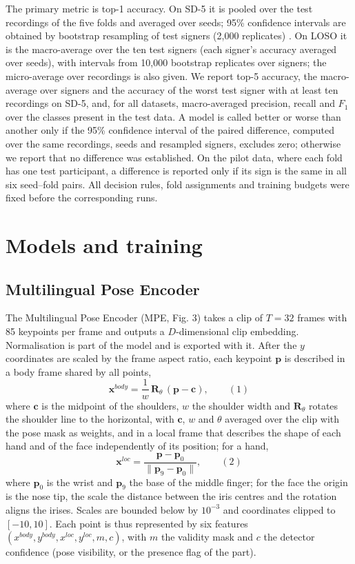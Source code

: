 \documentclass[a4paper,fleqn]{cas-dc}
\begin{document}
The primary metric is top-1 accuracy. On SD-5 it is pooled over the test recordings of the five folds and averaged over seeds; 95\% confidence intervals are obtained by bootstrap resampling of test signers (2,000 replicates) \cite{2016_efron_hastie_casi}. On LOSO it is the macro-average over the ten test signers (each signer's accuracy averaged over seeds), with intervals from 10,000 bootstrap replicates over signers; the micro-average over recordings is also given. We report top-5 accuracy, the macro-average over signers and the accuracy of the worst test signer with at least ten recordings on SD-5, and, for all datasets, macro-averaged precision, recall and \(F_1\) over the classes present in the test data. A model is called better or worse than another only if the 95\% confidence interval of the paired difference, computed over the same recordings, seeds and resampled signers, excludes zero; otherwise we report that no difference was established. On the pilot data, where each fold has one test participant, a difference is reported only if its sign is the same in all six seed--fold pairs. All decision rules, fold assignments and training budgets were fixed before the corresponding runs.

\hypertarget{models-and-training}{%
\section{Models and training}\label{models-and-training}}

\hypertarget{multilingual-pose-encoder}{%
\subsection{Multilingual Pose Encoder}\label{multilingual-pose-encoder}}

The Multilingual Pose Encoder (MPE, Fig. 3) takes a clip of \(T = 32\) frames with 85 keypoints per frame and outputs a \(D\)-dimensional clip embedding. Normalisation is part of the model and is exported with it. After the \(y\) coordinates are scaled by the frame aspect ratio, each keypoint \(\mathbf{p}\) is described in a body frame shared by all points, \[\mathbf{x}^{body} = \frac{1}{w}\,\mathbf{R}_{\theta}\,(\mathbf{p} - \mathbf{c}),\qquad(1)\] where \(\mathbf{c}\) is the midpoint of the shoulders, \(w\) the shoulder width and \(\mathbf{R}_{\theta}\) rotates the shoulder line to the horizontal, with \(\mathbf{c}\), \(w\) and \(\theta\) averaged over the clip with the pose mask as weights, and in a local frame that describes the shape of each hand and of the face independently of its position; for a hand, \[\mathbf{x}^{loc} = \frac{\mathbf{p} - \mathbf{p}_{0}}{\lVert \mathbf{p}_{9} - \mathbf{p}_{0} \rVert},\qquad(2)\] where \(\mathbf{p}_0\) is the wrist and \(\mathbf{p}_9\) the base of the middle finger; for the face the origin is the nose tip, the scale the distance between the iris centres and the rotation aligns the irises. Scales are bounded below by \(10^{-3}\) and coordinates clipped to \([-10, 10]\). Each point is thus represented by six features \((x^{body}, y^{body}, x^{loc}, y^{loc}, m, c)\), with \(m\) the validity mask and \(c\) the detector confidence (pose visibility, or the presence flag of the part).
\end{document}
